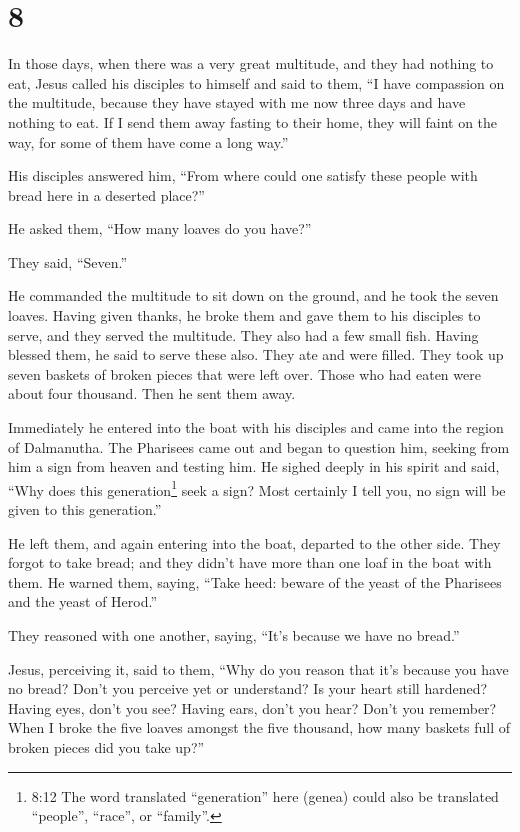 \hypertarget{section-7}{%
\section{8}\label{section-7}}

 In those days, when there was a very great multitude, and
they had nothing to eat, Jesus called his disciples to himself and said
to them,  ``I have compassion on the multitude, because they
have stayed with me now three days and have nothing to eat. 
If I send them away fasting to their home, they will faint on the way,
for some of them have come a long way.''

 His disciples answered him, ``From where could one satisfy
these people with bread here in a deserted place?''

 He asked them, ``How many loaves do you have?''

They said, ``Seven.''

 He commanded the multitude to sit down on the ground, and
he took the seven loaves. Having given thanks, he broke them and gave
them to his disciples to serve, and they served the multitude.
 They also had a few small fish. Having blessed them, he
said to serve these also.  They ate and were filled. They
took up seven baskets of broken pieces that were left over. 
Those who had eaten were about four thousand. Then he sent them away.

 Immediately he entered into the boat with his disciples
and came into the region of Dalmanutha.  The Pharisees came
out and began to question him, seeking from him a sign from heaven and
testing him.  He sighed deeply in his spirit and said,
``Why does this generation\footnote{8:12 The word translated
  ``generation'' here (genea) could also be translated ``people'',
  ``race'', or ``family''.} seek a sign? Most certainly I tell you, no
sign will be given to this generation.''

 He left them, and again entering into the boat, departed
to the other side.  They forgot to take bread; and they
didn't have more than one loaf in the boat with them.  He
warned them, saying, ``Take heed: beware of the yeast of the Pharisees
and the yeast of Herod.''

 They reasoned with one another, saying, ``It's because we
have no bread.''

 Jesus, perceiving it, said to them, ``Why do you reason
that it's because you have no bread? Don't you perceive yet or
understand? Is your heart still hardened?  Having eyes,
don't you see? Having ears, don't you hear? Don't you remember?
 When I broke the five loaves amongst the five thousand,
how many baskets full of broken pieces did you take up?''

